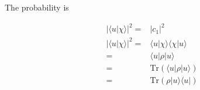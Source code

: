 \documentclass[10pt,fleqn]{article}
\newcommand{\Tr}{\mathrm{Tr}}
\newcommand{\eqar}[1]
{
  \begin{align*}
    #1
  \end{align*}
}
\newcommand{\paren}[1]{{\left({#1}\right)}}
\newcommand{\abs}[1]{{\left|{#1}\right|}}
\begin{document}
\subsection{}
\section{}
The probability is
\eqar{
  \abs{\langle u|\chi\rangle}^2=&\abs{c_1}^2\\
  \abs{\langle u|\chi\rangle}^2=&\langle u|\chi\rangle\langle \chi|u\rangle\\
  =&\langle u|\rho|u\rangle\\
  =&\Tr\paren{\langle u|\rho|u\rangle}\\
  =&\Tr\paren{\rho|u\rangle\langle u|}
}
\section{}
\subsection{}
\subsection{}
\subsection{}
\subsection{}
\subsection{}
\subsection{}
\subsection{}
\section{}
\subsection{}
\subsection{}
\end{document}
